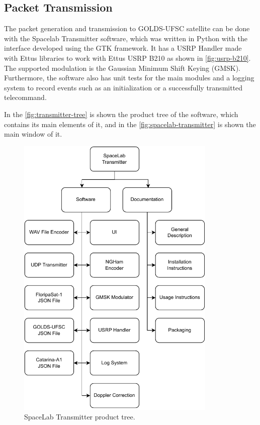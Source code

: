 \subsection{Packet Transmission}

The packet generation and transmission to GOLDS-UFSC satellite can be done with the Spacelab Transmitter software, which was written in Python with the interface developed using the GTK framework. It has a USRP Handler made with Ettus libraries to work with Ettus USRP B210 as shown in \autoref{fig:usrp-b210}. The supported modulation is the Gaussian Minimum Shift Keying (GMSK). Furthermore, the software also has unit tests for the main modules and a logging system to record events such as an initialization or a successfully transmitted telecommand. \cite{spacelab-transmitter}

In the \autoref{fig:transmitter-tree} is shown the product tree of the software, which contains its main elements of it, and in the \autoref{fig:spacelab-transmitter} is shown the main window of it.

\begin{figure}[!ht]
    \begin{center}
        \includegraphics[width=270pt]{figures/transmitter_tree.pdf}
        \caption{SpaceLab Transmitter product tree.}
        \label{fig:transmitter-tree}
    \end{center}
\end{figure}

